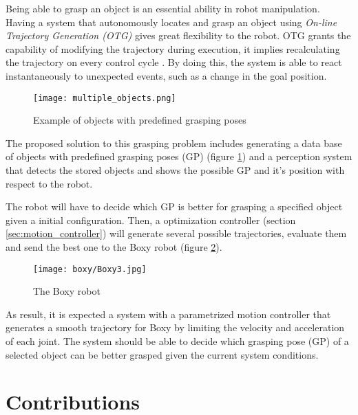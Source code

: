 Being able to grasp an object is an essential ability in robot manipulation. Having a system that autonomously locates and grasp an object using \textit{On-line Trajectory Generation (OTG)} gives great flexibility to the robot. OTG grants the capability of modifying the trajectory during execution, it implies recalculating the trajectory on every control cycle . By doing this, the system is able to react instantaneously to unexpected events, such as a change in the goal position.

\begin{figure}[H]
	\centering
	\texttt{[image: multiple\_objects.png]}
	\vspace{-10pt}
	\caption{Example of objects with predefined grasping poses}
	\vspace{-15pt}
	\label{fig:obj_grasp_pose}
\end{figure}

The proposed solution to this grasping problem includes generating a data base of objects with predefined grasping poses (GP) (figure \ref{fig:obj_grasp_pose}) and a perception system that detects the stored objects and shows the possible GP and it's position with respect to the robot.

The robot will have to decide which GP is better for grasping a specified object given a initial configuration. Then, a optimization controller (section \ref{sec:motion_controller}) will generate several possible trajectories, evaluate them and send the best one to the Boxy robot (figure \ref{fig:boxy}).

\begin{figure}[H]
	\centering
	\texttt{[image: boxy/Boxy3.jpg]}
	\vspace{-10pt}
	\caption{The Boxy robot}
	\vspace{-15pt}
	\label{fig:boxy}
\end{figure}

As result, it is expected a system with a parametrized motion controller that generates a smooth trajectory for Boxy by limiting the velocity and acceleration of each joint. The system should be able to decide which grasping pose (GP) of a selected object can be better grasped given the current system conditions.


\section{Contributions}

